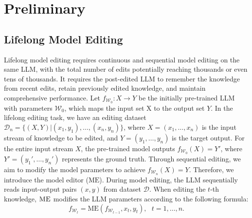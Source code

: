 \section{Preliminary}

\subsection{Lifelong Model Editing}
\label{section:2.1}
Lifelong model editing requires continuous and sequential model editing on the same LLM, with the total number of edits potentially reaching thousands or even tens of thousands. It requires the post-edited LLM to remember the knowledge from recent edits, retain previously edited knowledge, and maintain comprehensive performance. Let $f_{\mathcal{W}_0}: X\rightarrow Y$ be the initially pre-trained LLM with parameters $\mathcal{W}_0$, which maps the input set X to the output set $Y$. In the lifelong editing task, we have an editing dataset $\mathcal{D}_n=\{(X,  Y)|(x_1, y_1), \dots, (x_n, y_n)\}$, where $X=(x_1, \dots, x_n)$ is the input stream of knowledge to be edited, and $Y=(y_1, \dots,  y_n)$ is the target output. For the entire input stream $X$, the pre-trained model outputs $f_{\mathcal{W}_0}(X)=Y'$, where $Y'=(y_1', \dots, y_n')$ represents the ground truth. Through sequential editing, we aim to modify the model parameters to achieve $f_{\mathcal{W}_n}(X)=Y$. Therefore, we introduce the model editor ($\mathrm{ME}$). During model editing, the LLM sequentially reads input-output pairs $(x, y)$ from dataset $\mathcal{D}$. When editing the $t$-th knowledge, $\textsc{ME}$ modifies the LLM parameters according to the following formula:
\begin{equation}
    f_{\mathcal{W}_{t}} = \mathrm{ME}(f_{\mathcal{W}_{t-1}}, x_{t}, y_{t}), \ \ \ t= 1, \dots, n.
\end{equation}


